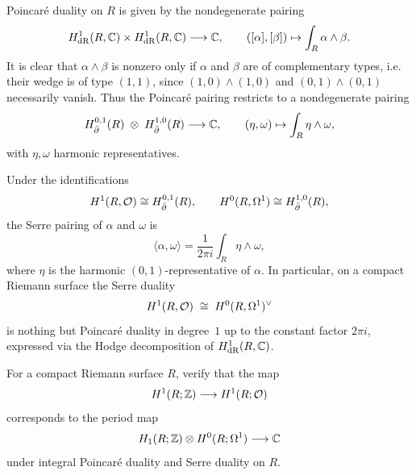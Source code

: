 \documentclass[12pt]{article}
\begin{document}
\begin{solution}
Poincaré duality on $R$ is given by the nondegenerate pairing
\[
H^1_{\operatorname{dR}}(R,\mathbb{C})\times H^1_{\operatorname{dR}}(R,\mathbb{C})
\longrightarrow \mathbb{C},
\qquad
([\alpha],[\beta])\mapsto\int_R \alpha\wedge\beta.
\]
It is clear that $\alpha \wedge \beta$ is nonzero only if
$\alpha$ and $\beta$ are of complementary types, i.e. their wedge is of type
$(1,1)$, since $(1,0)\wedge(1,0)$ and $(0,1)\wedge(0,1)$ necessarily vanish.
Thus the Poincaré pairing restricts to a nondegenerate pairing
\[
H^{0,1}_{\bar\partial}(R)\;\otimes\; H^{1,0}_{\bar\partial}(R)
\longrightarrow \mathbb{C},
\qquad
(\eta,\omega)\mapsto\int_R \eta\wedge\omega,
\]
with $\eta,\omega$ harmonic representatives.

Under the identifications
\[
H^1(R,{\mathcal{O}})\cong H^{0,1}_{\bar\partial}(R),
\qquad
H^0(R,\Omega^1)\cong H^{1,0}_{\bar\partial}(R),
\]
the Serre pairing of $\alpha$ and $\omega$ is
\[
\langle\alpha,\omega\rangle
= \frac{1}{2\pi i}\int_R \eta\wedge\omega,
\]
where $\eta$ is the harmonic $(0,1)$-representative of $\alpha$. In particular, on a compact Riemann surface the Serre duality
\[
H^1(R,{\mathcal{O}})\;\cong\;H^0(R,\Omega^1)^\vee
\]
is nothing but Poincaré duality in degree~$1$ up to the 
constant factor $2\pi i$, expressed via the Hodge
decomposition of $H^1_{\operatorname{dR}}(R,\mathbb{C})$.
\end{solution}

\begin{exercise}
For a compact Riemann surface $R$, verify that the map
\[
H^1(R;\mathbb{Z})\longrightarrow H^1(R;{\mathcal{O}})
\]
corresponds to the period map
\[
H_1(R;\mathbb{Z})\otimes H^0(R;\Omega^1)\longrightarrow \mathbb{C}
\]
under integral Poincar\'e duality and Serre duality on $R$.
\end{exercise}
\end{document}
